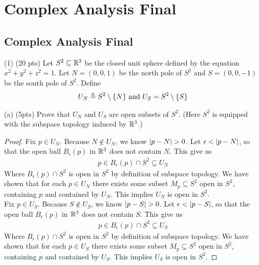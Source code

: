 \documentclass{report}
\begin{document}
\newpage%
\pagebreak
\chapter{Complex Analysis Final} 
\section{Complex Analysis Final}
\begin{mdframed}
  (1)  (20 pts) Let $S^2 \subseteq \mathbb{R}^3$ be the closed unit sphere defined by the equation $x^2+y^2+z^2=1$. Let $N=(0,0,1)$ be the north pole of $S^2$ and  $S=(0,0,-1)$ be the south pole of $S^2$. Define 
  \begin{align*}
  U_N \triangleq S^2 \setminus \{ N \} \text{ and }U_S = S^2 \setminus \{ S \}
  \end{align*}
\end{mdframed}
\begin{question}{}{}
  (a) (5pts) Prove that $U_N$ and  $U_S$ are open subsets of  $S^2$. (Here $S^2$ is equipped with the subspace topology induced by  $\mathbb{R}^3$.) 
\end{question}
\begin{proof}
Fix $p \in U_N$. Because $N \not\in  U_N$, we know $\abso{p-N}>0$. Let  $\epsilon<\left|p-N\right|$, so that the open ball $B_\epsilon (p)$ in $\mathbb{R}^3$ does not contain $N$. This give us 
 \begin{align*}
p \in B_\epsilon  (p)\cap S^2 \subseteq U_N
\end{align*}
Where $B_\epsilon (p)\cap S^2$ is open in $S^2$ by definition of subspace topology. We have shown that for each $p \in U_{N}$ there exists some subset $M_p \subseteq S^2$ open in $S^2$, containing $p$ and contained by  $U_N$. This implies  $U_N$ is open in  $S^2$.    \\


Fix $p \in U_S$. Because $S \not\in  U_S$, we know $\abso{p-S}>0$. Let  $\epsilon<\left|p-S\right|$, so that the open ball $B_\epsilon (p)$ in $\mathbb{R}^3$ does not contain $S$. This give us 
 \begin{align*}
p \in B_\epsilon  (p)\cap S^2 \subseteq U_S
\end{align*}
Where $B_\epsilon (p)\cap S^2$ is open in $S^2$ by definition of subspace topology. We have shown that for each $p \in U_{S}$ there exists some subset $M_p \subseteq S^2$ open in $S^2$, containing $p$ and contained by  $U_S$. This implies  $U_S$ is open in  $S^2$.    
\end{proof}
\end{document}

